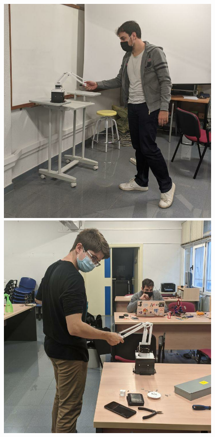 \begin{figure}[H]
    \centering
    \begin{minipage}{.32\linewidth}
        \includegraphics[width=\linewidth]{pictures/bye_javinator.png}
    \end{minipage}
    \hfill
    \begin{minipage}{.32\linewidth}
        \includegraphics[width=\linewidth]{pictures/bye_mihai.png}

\end{minipage}
\end{figure}
